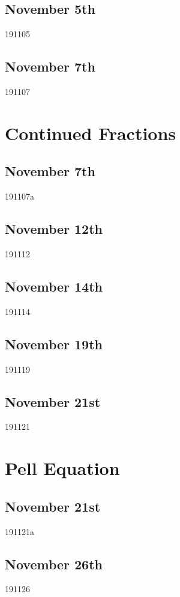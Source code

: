 \subsection{November 5th}
{191105}

\subsection{November 7th}
{191107}

\section{Continued Fractions}
\subsection{November 7th}
{191107a}

\subsection{November 12th}
{191112}

\subsection{November 14th}
{191114}

\subsection{November 19th}
{191119}

\subsection{November 21st}
{191121}

\section{Pell Equation}
\subsection{November 21st}
{191121a}

\subsection{November 26th}
{191126}

